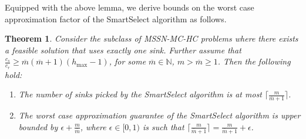 \documentclass[conference]{IEEEtran}
\newcommand{\mbar}{\overline{m}}
\newtheorem{theorem}{Theorem}
\begin{document}
Equipped with the above lemma, we derive bounds on the worst case approximation factor of the SmartSelect algorithm as follows.

\begin{theorem}
\label{thm:smartselect-approx_special}
Consider the subclass of MSSN-MC-HC problems where there exists a feasible solution that uses exactly one sink. Further assume that $\frac{c_s}{c_r}\geq \mbar(\mbar+1)(h_{\max}-1)$, for some $\mbar\in\mathbb{N}$, $m > \mbar \geq 1$. Then the following hold:
\begin{enumerate}
\item The number of sinks picked by the SmartSelect algorithm is at most $\lceil\frac{m}{\mbar + 1}\rceil$.
\item The worst case approximation guarantee of the SmartSelect algorithm is upper bounded by $\epsilon + \frac{m}{\mbar}$, where $\epsilon\in[0,1)$ is such that $\lceil\frac{m}{\mbar + 1}\rceil=\frac{m}{\mbar + 1}+\epsilon$.
\end{enumerate} 
\end{theorem}
\end{document}
